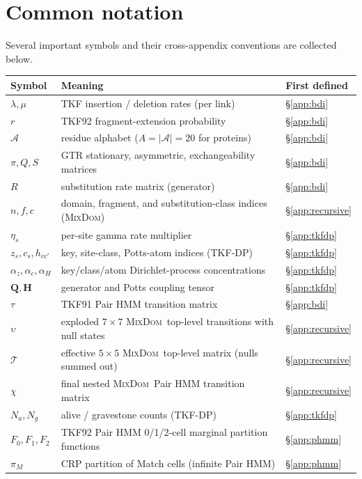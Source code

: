 \documentclass[11pt]{article}
\theoremstyle{remark}
\newcommand\insrate{\lambda}
\newcommand\delrate{\mu}
\newcommand\ext{r}
\newcommand\dom{n}
\newcommand\frag{f}
\newcommand\class{c}
\newcommand\alphabet{\mathcal{A}}
\newcommand\eqm{\pi}
\newcommand\exch{Q}
\newcommand\symsub{S}
\newcommand\revsub{R}
\newcommand\tkftrans{\tau}
\newcommand\exptrans{\upsilon}
\newcommand\transnest{\chi}
\newcommand\nonemptytrans{\mathcal{T}}
\newcommand{\Q}{\bm{Q}}
\newcommand{\Hh}{\bm{H}}
\newcommand{\MixDom}{\textsc{MixDom}}
\numberwithin{equation}{section}
\numberwithin{figure}{section}
\numberwithin{table}{section}
\begin{document}
\section*{Common notation}

\noindent Several important symbols and their cross-appendix
conventions are collected below.

\begin{center}
\small
\begin{tabular}{lll}
\toprule
\textbf{Symbol} & \textbf{Meaning} & \textbf{First defined} \\
\midrule
$\insrate, \delrate$ & TKF insertion / deletion rates (per link) & \S\ref{app:bdi} \\
$\ext$ & TKF92 fragment-extension probability & \S\ref{app:bdi} \\
$\alphabet$ & residue alphabet ($A = |\alphabet| = 20$ for proteins) & \S\ref{app:bdi} \\
$\eqm, \exch, \symsub$ & GTR stationary, asymmetric, exchangeability matrices & \S\ref{app:bdi} \\
$\revsub$ & substitution rate matrix (generator) & \S\ref{app:bdi} \\
$\dom, \frag, \class$ & domain, fragment, and substitution-class indices (\MixDom) & \S\ref{app:recursive} \\
$\eta_s$ & per-site gamma rate multiplier & \S\ref{app:tkfdp} \\
$z_s, c_s, h_{cc'}$ & key, site-class, Potts-atom indices (TKF-DP) & \S\ref{app:tkfdp} \\
$\alpha_z, \alpha_c, \alpha_H$ & key/class/atom Dirichlet-process concentrations & \S\ref{app:tkfdp} \\
$\Q, \Hh$ & generator and Potts coupling tensor & \S\ref{app:tkfdp} \\
$\tkftrans$ & TKF91 Pair HMM transition matrix & \S\ref{app:bdi} \\
$\exptrans$ & exploded $7{\times}7$ \MixDom\ top-level transitions with null states & \S\ref{app:recursive} \\
$\nonemptytrans$ & effective $5{\times}5$ \MixDom\ top-level matrix (nulls summed out) & \S\ref{app:recursive} \\
$\transnest$ & final nested \MixDom\ Pair HMM transition matrix & \S\ref{app:recursive} \\
$N_a, N_g$ & alive / gravestone counts (TKF-DP) & \S\ref{app:tkfdp} \\
$F_0, F_1, F_2$ & TKF92 Pair HMM 0/1/2-cell marginal partition functions & \S\ref{app:phmm} \\
$\pi_{\!M}$ & CRP partition of Match cells (infinite Pair HMM) & \S\ref{app:phmm} \\
\bottomrule
\end{tabular}
\end{center}
\end{document}

